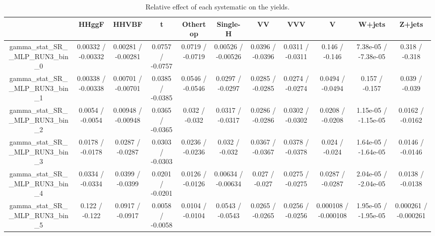 \documentclass[10pt]{article}
\begin{document}
\begin{table}[htbp]
\begin{center}
\begin{tabular}{|c|c|c|c|c|c|c|c|c|c|c|}
\hline 
      & HHggF      & HHVBF      & t      & Othertop      & Single-H      & VV      & VVV      & V      & W+jets      & Z+jets \\ 
\hline 
  gamma_stat_SR__MLP_RUN3_bin_0 & 0.00332 / -0.00332 & 0.00281 / -0.00281 & 0.0757 / -0.0757 & 0.0719 / -0.0719 & 0.00526 / -0.00526 & 0.0396 / -0.0396 & 0.0311 / -0.0311 & 0.146 / -0.146 & 7.38e-05 / -7.38e-05 & 0.318 / -0.318 \\ 
  gamma_stat_SR__MLP_RUN3_bin_1 & 0.00338 / -0.00338 & 0.00701 / -0.00701 & 0.0385 / -0.0385 & 0.0546 / -0.0546 & 0.0297 / -0.0297 & 0.0285 / -0.0285 & 0.0274 / -0.0274 & 0.0494 / -0.0494 & 0.157 / -0.157 & 0.039 / -0.039 \\ 
  gamma_stat_SR__MLP_RUN3_bin_2 & 0.0054 / -0.0054 & 0.00948 / -0.00948 & 0.0365 / -0.0365 & 0.032 / -0.032 & 0.0317 / -0.0317 & 0.0286 / -0.0286 & 0.0302 / -0.0302 & 0.0208 / -0.0208 & 1.15e-05 / -1.15e-05 & 0.0162 / -0.0162 \\ 
  gamma_stat_SR__MLP_RUN3_bin_3 & 0.0178 / -0.0178 & 0.0287 / -0.0287 & 0.0303 / -0.0303 & 0.0236 / -0.0236 & 0.032 / -0.032 & 0.0367 / -0.0367 & 0.0378 / -0.0378 & 0.024 / -0.024 & 1.64e-05 / -1.64e-05 & 0.0146 / -0.0146 \\ 
  gamma_stat_SR__MLP_RUN3_bin_4 & 0.0334 / -0.0334 & 0.0399 / -0.0399 & 0.0201 / -0.0201 & 0.0126 / -0.0126 & 0.00634 / -0.00634 & 0.027 / -0.027 & 0.0275 / -0.0275 & 0.0287 / -0.0287 & 2.04e-05 / -2.04e-05 & 0.0138 / -0.0138 \\ 
  gamma_stat_SR__MLP_RUN3_bin_5 & 0.122 / -0.122 & 0.0917 / -0.0917 & 0.0058 / -0.0058 & 0.0104 / -0.0104 & 0.0543 / -0.0543 & 0.0265 / -0.0265 & 0.0256 / -0.0256 & 0.000108 / -0.000108 & 1.95e-05 / -1.95e-05 & 0.000261 / -0.000261 \\ 
\hline 
\end{tabular} 
\caption{Relative effect of each systematic on the yields.} 
\end{center} 
\end{table} 
\end{document}
